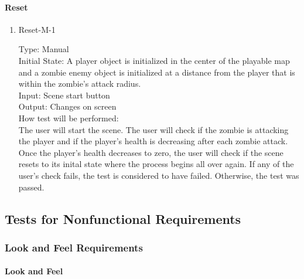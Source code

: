 \documentclass[12pt, titlepage]{article}
\begin{document}
\paragraph{Reset}

\begin{enumerate}

\item{Reset-M-1\\}

Type: Manual \\
					
Initial State: A player object is initialized in the center of the playable map and a zombie enemy object is initialized at a distance from the player that is within the zombie's attack radius.\\
					
Input: Scene start button \\
					
Output: Changes on screen \\
					
How test will be performed:\\  The user will start the scene. The user will check if the zombie is attacking the player and if the player's health is decreasing after each zombie attack. Once the player's health decreases to zero, the user will check if the scene resets to its inital state where the process begins all over again. If any of the user's check fails, the test is considered to have failed. Otherwise, the test was passed. \\

\end{enumerate}

\subsection{Tests for Nonfunctional Requirements}

\subsubsection{Look and Feel Requirements}

\paragraph{Look and Feel}
\end{document}
